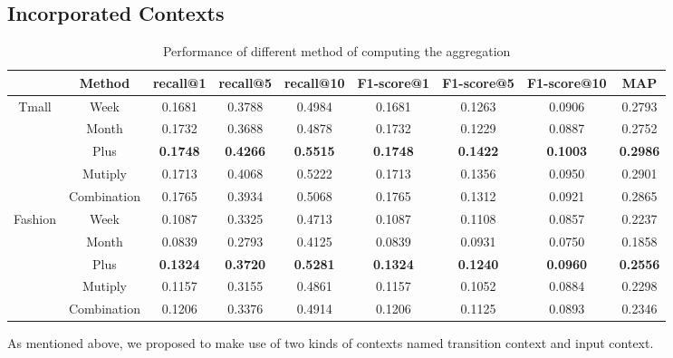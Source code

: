 \documentclass[conference]{IEEEtran}
\begin{document}
\subsection{Incorporated Contexts }

\begin{table}[!htbp]
\centering\scriptsize
\caption{Performance of different method of computing the aggregation}
    \begin{tabular}{ccccccccc}
    \toprule
          & Method& recall@1 & recall@5 & recall@10&F1-score@1 & F1-score@5 & F1-score@10&MAP\\
    \midrule
    \multirow{5}[0]{*}{Tmall} 
        &Week& 0.1681& 0.3788& 0.4984& 0.1681& 0.1263& 0.0906&0.2793\\
        &Month& 0.1732& 0.3688& 0.4878& 0.1732& 0.1229& 0.0887&0.2752\\
        &Plus& \textbf{0.1748}& \textbf{0.4266}& \textbf{0.5515}& \textbf{0.1748}& \textbf{0.1422}& \textbf{0.1003}& \textbf{0.2986}\\
        &Mutiply& 0.1713& 0.4068& 0.5222& 0.1713& 0.1356& 0.0950&0.2901\\
        &Combination& 0.1765& 0.3934& 0.5068& 0.1765& 0.1312& 0.0921&0.2865\\
    \midrule
    \multirow{5}[0]{*}{Fashion} 
        &Week& 0.1087& 0.3325& 0.4713& 0.1087& 0.1108& 0.0857&0.2237\\
        &Month& 0.0839& 0.2793& 0.4125& 0.0839& 0.0931& 0.0750&0.1858\\
        &Plus& \textbf{0.1324}& \textbf{0.3720}& \textbf{0.5281}& \textbf{0.1324}& \textbf{0.1240}& \textbf{0.0960}& \textbf{0.2556}\\
        &Mutiply& 0.1157& 0.3155& 0.4861& 0.1157& 0.1052& 0.0884&0.2298\\
        &Combination& 0.1206& 0.3376& 0.4914& 0.1206& 0.1125& 0.0893&0.2346\\
    \bottomrule
\end{tabular}%
\end{table}%


As mentioned above, we proposed to make use of two kinds of contexts named transition context and input context.
\end{document}
